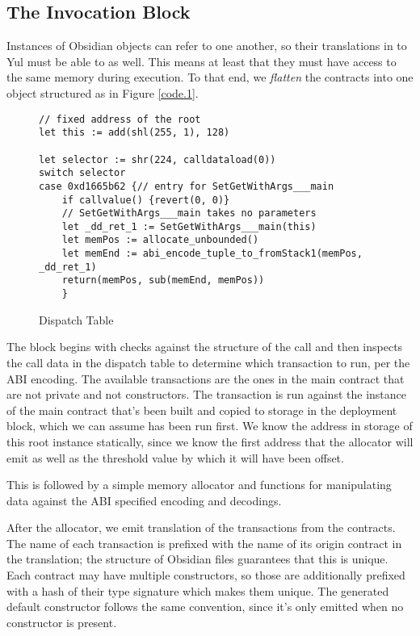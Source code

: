 \subsection{The Invocation Block}

Instances of Obsidian objects can refer to one another, so their
translations in to Yul must be able to as well. This means at least that
they must have access to the same memory during execution. To that end, we
\emph{flatten} the contracts into one object structured as in Figure
\ref{code.1}.

\begin{figure}[hbtp]
    \caption{Dispatch Table}
    \label{code.7}
    \begin{lstlisting}[language=yul,frame=single]
// fixed address of the root
let this := add(shl(255, 1), 128)

let selector := shr(224, calldataload(0))
switch selector
case 0xd1665b62 {// entry for SetGetWithArgs___main
    if callvalue() {revert(0, 0)}
    // SetGetWithArgs___main takes no parameters
    let _dd_ret_1 := SetGetWithArgs___main(this)
    let memPos := allocate_unbounded()
    let memEnd := abi_encode_tuple_to_fromStack1(memPos, _dd_ret_1)
    return(memPos, sub(memEnd, memPos))
    }
    \end{lstlisting}
\end{figure}

The block begins with checks against the structure of the call and then
inspects the call data in the dispatch table to determine which transaction
to run, per the ABI encoding. The available transactions are the ones in
the main contract that are not private and not constructors. The
transaction is run against the instance of the main contract that's been
built and copied to storage in the deployment block, which we can assume
has been run first. We know the address in storage of this root instance
statically, since we know the first address that the allocator will emit as
well as the threshold value by which it will have been offset.

This is followed by a simple memory allocator and functions for
manipulating data against the ABI specified encoding and decodings.


After the allocator, we emit translation of the transactions from the
contracts. The name of each transaction is prefixed with the name of its
origin contract in the translation; the structure of Obsidian files
guarantees that this is unique. Each contract may have multiple
constructors, so those are additionally prefixed with a hash of their type
signature which makes them unique. The generated default constructor
follows the same convention, since it's only emitted when no constructor is
present.

